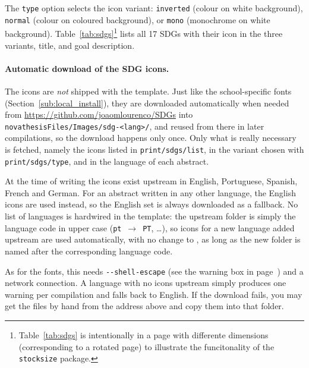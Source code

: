 The \texttt{type} option selects the icon variant: \texttt{inverted} (colour on white background), \texttt{normal} (colour on coloured background), or \texttt{mono} (monochrome on white background).  Table~\ref{tab:sdgs}\footnote{Table~\ref{tab:sdgs} is intentionally in a page with differente dimensions (corresponding to a rotated page) to illustrate the funcitonality of the \texttt{stocksize} package.} lists all 17 SDGs with their icon in the three variants, title, and goal description.

\paragraph{Automatic download of the SDG icons.}  The  icons are \emph{not} shipped with the template.  Just like the school-specific fonts (Section~\ref{sub:local_install}), they are downloaded automatically when needed from \url{https://github.com/joaomlourenco/SDGs} into \verb!novathesisFiles/Images/sdg-<lang>/!, and reused from there in later compilations, so the download happens only once.  Only what is really necessary is fetched, namely the icons listed in \texttt{print/sdgs/list}, in the variant chosen with \texttt{print/sdgs/type}, and in the language of each abstract.

At the time of writing the icons exist upstream in English, Portuguese, Spanish, French and German.  For an abstract written in any other language, the English icons are used instead, so the English set is always downloaded as a fallback.  No list of languages is hardwired in the template: the upstream folder is simply the language code in upper case (\texttt{pt}~$\rightarrow$~\texttt{PT}, \ldots), so icons for a new language added upstream are used automatically, with no change to \novathesis{}, as long as the new folder is named after the corresponding language code.

As for the fonts, this needs \texttt{-{}-shell-escape} (see the warning box in page~\pageref{box:shell-escape-security}) and a network connection.  A language with no icons upstream simply produces one warning per compilation and falls back to English.  If the download fails, you may get the files by hand from the address above and copy them into that folder.

\begingroup
\endgroup

